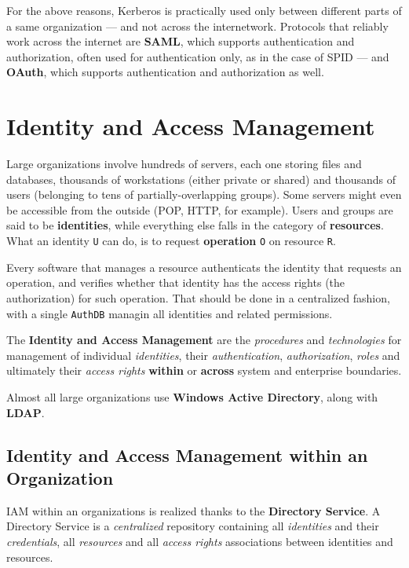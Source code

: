 \documentclass[10pt]{\classname}
\begin{document}
For the above reasons, Kerberos is practically used only between different
parts of a same organization --- and not across the internetwork. Protocols that
reliably work across the internet are \textbf{SAML}, which supports
authentication and authorization, often used for authentication only, as in the
case of SPID --- and \textbf{OAuth}, which supports authentication and
authorization as well.






\chapter{Identity and Access Management}

Large organizations involve hundreds of servers, each one storing files and
databases, thousands of workstations (either private or shared) and thousands
of users (belonging to tens of partially\--overlapping groups). Some servers
might even be accessible from the outside (POP, HTTP, for example). Users and
groups are said to be \textbf{identities}, while everything else falls in the
category of \textbf{resources}. What an identity \texttt{U} can do, is to
request \textbf{operation} \texttt{O} on resource \texttt{R}. 

Every software that manages a resource authenticats the identity that requests
an operation, and verifies whether that identity has the access rights (the
authorization) for such operation. That should be done in a centralized
fashion, with a single \texttt{AuthDB} managin all identities and related
permissions.

The \textbf{Identity and Access Management} are the \emph{procedures} and
\emph{technologies} for management of individual \emph{identities}, their
\emph{authentication}, \emph{authorization}, \emph{roles} and ultimately their
\emph{access rights} \textbf{within} or \textbf{across} system and enterprise
boundaries.

Almost all large organizations use \textbf{Windows Active Directory}, along
with \textbf{LDAP}.

\section{Identity and Access Management within an Organization}

IAM within an organizations is realized thanks to the \textbf{Directory
Service}. A Directory Service is a \emph{centralized} repository containing all
\emph{identities} and their \emph{credentials}, all \emph{resources} and all
\emph{access rights} associations between identities and resources.
\end{document}
